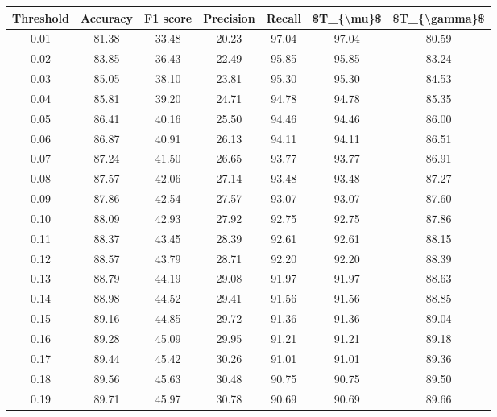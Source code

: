 \begin{tabular}{|c|c|c|c|c|c|c|}
\hline
 Threshold &  Accuracy &  F1 score &  Precision &  Recall &  \$T\_\{\textbackslash mu\}\$ &  \$T\_\{\textbackslash gamma\}\$ \\
\hline
      0.01 &     81.38 &     33.48 &      20.23 &   97.04 &      97.04 &         80.59 \\
      0.02 &     83.85 &     36.43 &      22.49 &   95.85 &      95.85 &         83.24 \\
      0.03 &     85.05 &     38.10 &      23.81 &   95.30 &      95.30 &         84.53 \\
      0.04 &     85.81 &     39.20 &      24.71 &   94.78 &      94.78 &         85.35 \\
      0.05 &     86.41 &     40.16 &      25.50 &   94.46 &      94.46 &         86.00 \\
      0.06 &     86.87 &     40.91 &      26.13 &   94.11 &      94.11 &         86.51 \\
      0.07 &     87.24 &     41.50 &      26.65 &   93.77 &      93.77 &         86.91 \\
      0.08 &     87.57 &     42.06 &      27.14 &   93.48 &      93.48 &         87.27 \\
      0.09 &     87.86 &     42.54 &      27.57 &   93.07 &      93.07 &         87.60 \\
      0.10 &     88.09 &     42.93 &      27.92 &   92.75 &      92.75 &         87.86 \\
      0.11 &     88.37 &     43.45 &      28.39 &   92.61 &      92.61 &         88.15 \\
      0.12 &     88.57 &     43.79 &      28.71 &   92.20 &      92.20 &         88.39 \\
      0.13 &     88.79 &     44.19 &      29.08 &   91.97 &      91.97 &         88.63 \\
      0.14 &     88.98 &     44.52 &      29.41 &   91.56 &      91.56 &         88.85 \\
      0.15 &     89.16 &     44.85 &      29.72 &   91.36 &      91.36 &         89.04 \\
      0.16 &     89.28 &     45.09 &      29.95 &   91.21 &      91.21 &         89.18 \\
      0.17 &     89.44 &     45.42 &      30.26 &   91.01 &      91.01 &         89.36 \\
      0.18 &     89.56 &     45.63 &      30.48 &   90.75 &      90.75 &         89.50 \\
      0.19 &     89.71 &     45.97 &      30.78 &   90.69 &      90.69 &         89.66 \\

\end{tabular}
